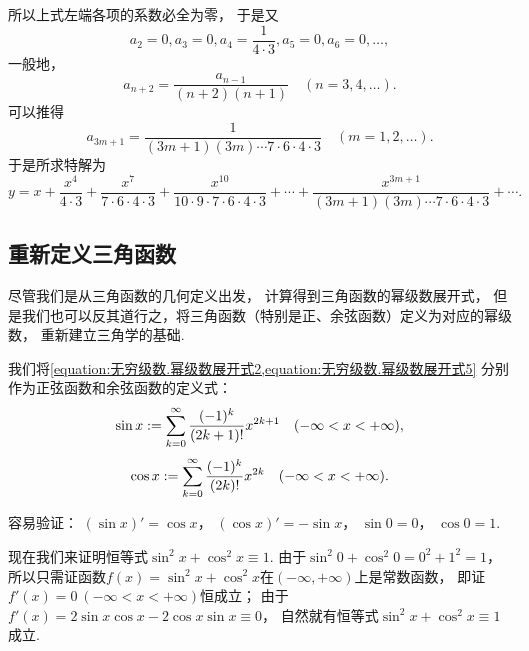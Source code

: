 \begin{example}
\begin{solution}
所以上式左端各项的系数必全为零，
于是又\begin{equation*}
	a_2 = 0,
	a_3 = 0,
	a_4 = \frac{1}{4\cdot3},
	a_5 = 0,
	a_6 = 0,
	\dotsc,
\end{equation*}
一般地，\begin{equation*}
	a_{n+2} = \frac{a_{n-1}}{(n+2)(n+1)}
	\quad(n=3,4,\dotsc).
\end{equation*}
可以推得\begin{equation*}
	a_{3m+1} = \frac{1}{(3m+1)(3m) \dotsm 7\cdot6\cdot4\cdot3}
	\quad(m=1,2,\dotsc).
\end{equation*}
于是所求特解为\begin{equation*}
	y = x + \frac{x^4}{4\cdot3} + \frac{x^7}{7\cdot6\cdot4\cdot3}
	+ \frac{x^{10}}{10\cdot9\cdot7\cdot6\cdot4\cdot3}
	+ \dotsb
	+ \frac{x^{3m+1}}{(3m+1)(3m) \dotsm 7\cdot6\cdot4\cdot3}
	+ \dotsb.
\end{equation*}
\end{solution}
\end{example}

\subsection{重新定义三角函数}
尽管我们是从三角函数的几何定义出发，
计算得到三角函数的幂级数展开式，
但是我们也可以反其道行之，将三角函数（特别是正、余弦函数）定义为对应的幂级数，
重新建立三角学的基础.

我们将\cref{equation:无穷级数.幂级数展开式2,equation:无穷级数.幂级数展开式5}
分别作为正弦函数和余弦函数的定义式：
\begin{equation*}
	\sin x := \sum_{k=0}^\infty \frac{(-1)^k}{(2k+1)!} x^{2k+1}
	\quad(-\infty<x<+\infty),
\end{equation*}\begin{equation*}
	\cos x := \sum_{k=0}^\infty \frac{(-1)^k}{(2k)!} x^{2k}
	\quad(-\infty<x<+\infty).
\end{equation*}

容易验证：
\((\sin x)' = \cos x\)，
\((\cos x)' = - \sin x\)，
\(\sin 0 = 0\)，
\(\cos 0 = 1\).

现在我们来证明恒等式\(\sin^2 x + \cos^2 x \equiv 1\).
由于\(\sin^2 0 + \cos^2 0 = 0^2 + 1^2 = 1\)，
所以只需证函数\(f(x) = \sin^2 x + \cos^2 x\)在\((-\infty,+\infty)\)上是常数函数，
即证\(f'(x) = 0\ (-\infty<x<+\infty)\)恒成立；
由于\(f'(x) = 2 \sin x \cos x - 2 \cos x \sin x \equiv 0\)，
自然就有恒等式\(\sin^2 x + \cos^2 x \equiv 1\)成立.

